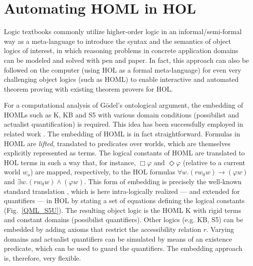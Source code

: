 \documentclass{article}
\newcommand{\imp}{{\rightarrow}}
\begin{document}








\section{Automating HOML in HOL}\label{sec:homlinhol}

Logic textbooks %
commonly utilize higher-order logic in an informal/semi-formal way as
a meta-language to introduce the syntax and the semantics of object
logics of interest, in which reasoning problems in concrete
application domains can be modeled and solved with pen and paper. In
fact, this approach can also be followed on the computer (using HOL as
a formal meta-language) for even very challenging object logics (such
as HOML) to enable interactive and automated theorem proving with
existing theorem provers for HOL.


For a computational analysis of G\"odel's ontological argument, the embedding of HOMLs such as K,
KB and S5 with various domain conditions (possibilist and actualist quantification)
is required. This idea has been successfully employed in related work
\cite{C40}. The embedding of HOML is in fact
straightforward. Formulas in HOML are \emph{lifted}, translated to predicates
over worlds, which are themselves explicitly represented as
terms. The logical constants of HOML are translated to HOL terms in such a way that, for instance, 
$\Box \varphi$ and $\Diamond \varphi$ (relative to a current world
$w_o$) are mapped, respectively, to the HOL formulas
$\forall w. (r w_0 w) \imp (\varphi w)$ and
$\exists w. (r w_0 w) \wedge (\varphi w)$. This form of embedding is
precisely the well-known standard translation
\cite{DBLP:journals/logcom/Ohlbach91}, which is here intra-logically
realized --- and extended for quantifiers --- in HOL by stating a set
of equations defining the logical constants (Fig.~\ref{QML_S5U}). The
resulting object logic is the HOML K with rigid terms and constant
domains (possibilist quantifiers). Other logics (e.g. KB, S5) can be
embedded by adding axioms that restrict the accessibility relation
$r$. Varying domains and actualist quantifiers can be simulated by
means of an existence predicate, which can be used to guard the
quantifiers. The embedding approach is, therefore, very flexible.
\end{document}
